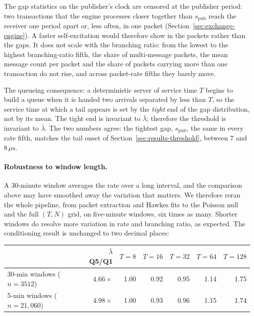\documentclass[11pt]{article}
\newcommand{\spub}{s_{\mathrm{pub}}}
\begin{document}
The gap statistics on the publisher's clock are censored at the publisher period: two
transactions that the engine processes closer together than $\spub$ reach the receiver one
period apart or, less often, in one packet (Section~\ref{sec:exchange-engine}). A faster self-excitation would therefore show in
the packets rather than the gaps. It does not scale with the branching ratio: from the
lowest to the highest branching-ratio fifth, the share of multi-message packets, the mean
message count per packet and the share of packets carrying more than one transaction do
not rise, and across packet-rate fifths they barely move.

The queueing consequence: a deterministic server of service time $T$
begins to build a queue when it is handed two arrivals separated by less than $T$, so the
service time at which a tail appears is set by the \emph{tight} end of the gap
distribution, not by its mean. The tight end is invariant to $\bar\lambda$; therefore the threshold is invariant to
$\bar\lambda$. The two numbers agree: the tightest gap, $\spub$, the same in every
rate fifth, matches the tail onset of Section~\ref{sec:results-threshold}, between $7$ and
$8\,\mu\mathrm{s}$.

\paragraph{Robustness to window length.} A 30-minute window averages the rate over a long
interval, and the comparison above may have smoothed away the variation that matters. We
therefore reran the whole pipeline, from packet extraction and Hawkes fits to the Poisson
null and the full $(T, N)$ grid, on five-minute windows, six times as many. Shorter windows
do resolve more variation in rate and branching ratio, as expected. The conditioning
result is unchanged to two decimal places:

\begin{center}
\begin{tabular}{lrrrrrr}
\toprule
& $\bar\lambda$ Q5/Q1 & $T{=}8$ & $T{=}16$ & $T{=}32$ & $T{=}64$ & $T{=}128$ \\
\midrule
30-min windows ($n = 3512$)     & $4.66\times$ & 1.00 & 0.92 & 0.95 & 1.14 & 1.75 \\
\phantom{0}5-min windows ($n = 21{,}060$) & $4.98\times$ & 1.00 & 0.93 & 0.96 & 1.15 & 1.74 \\
\bottomrule
\end{tabular}
\end{center}
\end{document}
